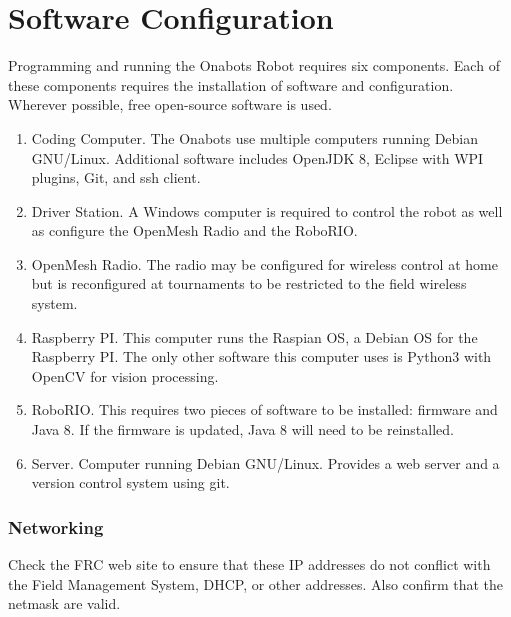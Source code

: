 \chapter{Software Configuration}

Programming and running the Onabots Robot requires six components. Each of these components requires the installation of software and configuration. Wherever possible, free open-source software is used.

\begin{enumerate}[label=$\Box$]

	\item Coding Computer. The Onabots use multiple computers running Debian GNU/Linux. Additional software includes OpenJDK 8, Eclipse with WPI plugins, Git, and ssh client.

	\item Driver Station. A Windows computer is required to control the robot as well as configure the OpenMesh Radio and the RoboRIO.

	\item OpenMesh Radio. The radio may be configured for wireless control at home but is reconfigured at tournaments to be restricted to the field wireless system.

	\item Raspberry PI. This computer runs the Raspian OS, a Debian OS for the Raspberry PI. The only other software this computer uses is Python3 with OpenCV for vision processing.

	\item RoboRIO. This requires two pieces of software to be installed: firmware and Java 8. If the firmware is updated, Java 8 will need to be reinstalled.

	\item Server. Computer running Debian GNU/Linux. Provides a web server and a version control system using git.
	
\end{enumerate}


	\subsection*{Networking}
	Check the FRC web site to ensure that these IP addresses do not conflict with the Field Management System, DHCP, or other addresses. Also confirm that the netmask are valid.
	\vspace*{3mm}

